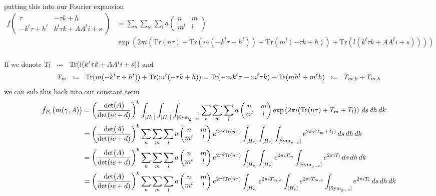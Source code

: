 putting this into our Fourier expansion
\begin{align*}
    f\begin{pmatrix} \tau & -\tau k + h\\ -k^t \tau + h^t & k^t \tau k + A A^t i + s \end{pmatrix} &= \sum_{n} \sum_{m} \sum_{l} a\begin{pmatrix} n & m\\ m^t & l \end{pmatrix} \\
    &\exp \left(2\pi i (\mathrm{Tr} (n\tau) +  \mathrm{Tr} (m(-k^t \tau + h^t )) +  \mathrm{Tr} (m^t(-\tau k + h)) +  \mathrm{Tr} (l( k^t \tau k + A A^t i + s))) \right)  \\
\end{align*}

If we denote \(T_l \defeq \mathrm{Tr} (l( k^t \tau k + A A^t i + s))\) and 
\[T_{m} \defeq \mathrm{Tr} (m(-k^t \tau + h^t )) +  \mathrm{Tr} (m^t(-\tau k + h)) = \mathrm{Tr}(-mk^t\tau - m^t\tau k) + \mathrm{Tr}(mh^t + m^th) \defeq T_{m,k} + T_{m,h}\]
we can sub this back into our constant term
\begin{align*}
    \tilde f_{P_r}\bigl(m(\gamma, A)\bigr)
     &= \left(\frac{\det(A)}{\det(ic + d)}\right)^{k} \int^{}_{[H_r]}\int^{}_{[H_r]}\int^{}_{[\mathrm{Sym}_{g-r}]} \sum_{n} \sum_{m} \sum_{l} a\begin{pmatrix} n & m\\ m^t & l \end{pmatrix}\exp \left(2\pi i (\mathrm{Tr} (n\tau) +  T_m + T_l) \right)
     \,ds\,dh\,dk\\
     &= \left(\frac{\det(A)}{\det(ic + d)}\right)^{k} \sum_{n} \sum_{m} \sum_{l} a\begin{pmatrix} n & m\\ m^t & l \end{pmatrix}e^{2\pi i \mathrm{Tr} (n\tau)}
     \int^{}_{[H_r]}\int^{}_{[H_r]}\int^{}_{[\mathrm{Sym}_{g-r}]}  e^{2\pi i(T_m + T_l)}  \,ds\,dh\,dk\\
     &= \left(\frac{\det(A)}{\det(ic + d)}\right)^{k} \sum_{n} \sum_{m} \sum_{l} a\begin{pmatrix} n & m\\ m^t & l \end{pmatrix}e^{2\pi i \mathrm{Tr} (n\tau)}
     \int^{}_{[H_r]}\int^{}_{[H_r]}e^{2\pi iT_m} \int^{}_{[\mathrm{Sym}_{g-r}]}  e^{2\pi iT_l}  \,ds\,dh\,dk\\
     &= \left(\frac{\det(A)}{\det(ic + d)}\right)^{k} \sum_{n} \sum_{m} \sum_{l} a\begin{pmatrix} n & m\\ m^t & l \end{pmatrix}e^{2\pi i \mathrm{Tr} (n\tau)}
     \int^{}_{[H_r]}e^{2\pi iT_{m,k}}\int^{}_{[H_r]}e^{2\pi i T_{m,h}} \int^{}_{[\mathrm{Sym}_{g-r}]}  e^{2\pi iT_l}  \,ds\,dh\,dk\\
\end{align*}
